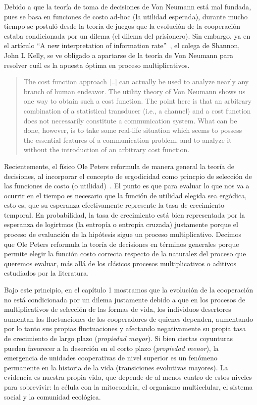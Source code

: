 \documentclass[a4paper,11pt]{book}
\theoremstyle{definition}
\begin{document}
Debido a que la teoría de toma de decisiones de Von Neumann está mal fundada, pues se basa en funciones de costo ad-hoc (la utilidad esperada), durante mucho tiempo se postuló desde la teoría de juegos que la evolución de la cooperación estaba condicionada por un dilema (el dilema del prisionero).
%
Sin embargo, ya en el artículo ``A new interpretation of information rate''~\cite{kelly1956}, el colega de Shannon, John L Kelly, se ve obligado a apartarse de la teoría de Von Neumann para resolver cuál es la apuesta óptima en proceso multiplicativos.
%
\begin{quotation}
The cost function approach [..] can actually be used to analyze nearly any branch of human endeavor.
The utility theory of Von Neumann shows us one way to obtain such a cost function.
The point here is that an arbitrary combination of a statistical transducer (i.e., a channel) and a cost function does not necessarily constitute a communication system.
What can be done, however, is to take some real-life situation which seems to possess the essential features of a communication problem, and to analyze it without the introduction of an arbitrary cost function.
\end{quotation}
%
Recientemente, el físico Ole Peters reformula de manera general la teoría de decisiones, al incorporar el concepto de ergodicidad como princpio de selección de las funciones de costo (o utilidad)~\cite{peters2019-ergodicityEconomics, peters2021-interpretation}.
%
El punto es que para evaluar lo que nos va a ocurrir en el tiempo es necesario que la función de utilidad elegida sea ergódica, esto es, que su esperanza efectivamente represente la tasa de crecimiento temporal.
%
En probabilidad, la tasa de crecimiento está bien representada por la esperanza de logirtmos (la entropía o entropía cruzada) justamente porque el proceso de evaluación de la hipótesis sigue un proceso multiplicativo.
%
Decimos que Ole Peters reformula la teoría de decisiones en términos generales porque permite elegir la función costo correcta respecto de la naturalez del proceso que queremos evaluar, más allá de los clásicos procesos multiplicativos o aditivos estudiados por la literatura.


Bajo este principio, en el capítulo 1 mostramos que la evolución de la cooperación no está condicionada por un dilema justamente debido a que en los procesos de multiplicativos de selección de las formas de vida, los individuos desertores aumentan las fluctuaciones de los cooperadores de quienes dependen, aumentando por lo tanto sus propias fluctuaciones y afectando negativamente su propia tasa de crecimiento de largo plazo (\emph{propiedad mayor}).
%
Si bien ciertas coyunturas pueden favorecer a la deserción en el corto plazo (\emph{propiedad menor}), la emergencia de unidades cooperativas de nivel superior es un fenómeno permanente en la historia de la vida (transiciones evolutivas mayores).
%
La evidencia es nuestra propia vida, que depende de al menos cuatro de estos niveles para sobrevivir: la célula con la mitocondria, el organismo multicelular, el sistema social y la comunidad ecológica.
\end{document}
